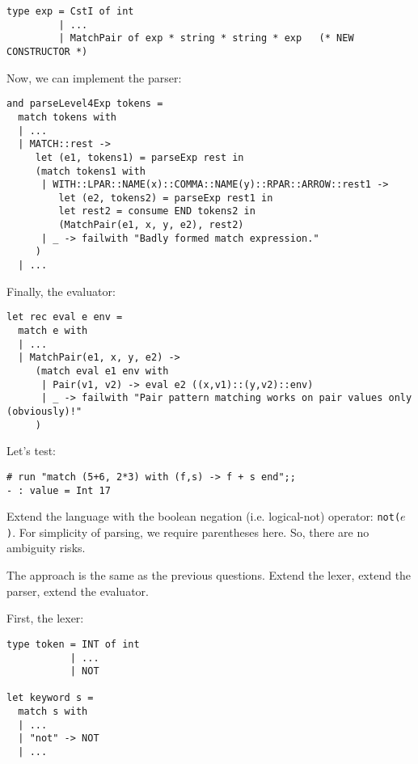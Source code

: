 \documentclass[addpoints]{exam}
\begin{document}
\begin{questions}
\begin{solution}
    \begin{verbatim}
type exp = CstI of int
         | ...
         | MatchPair of exp * string * string * exp   (* NEW CONSTRUCTOR *)
    \end{verbatim}

    Now, we can implement the parser:

    \begin{verbatim}
and parseLevel4Exp tokens =
  match tokens with
  | ...
  | MATCH::rest ->
     let (e1, tokens1) = parseExp rest in
     (match tokens1 with
      | WITH::LPAR::NAME(x)::COMMA::NAME(y)::RPAR::ARROW::rest1 ->
         let (e2, tokens2) = parseExp rest1 in
         let rest2 = consume END tokens2 in
         (MatchPair(e1, x, y, e2), rest2)
      | _ -> failwith "Badly formed match expression."
     )
  | ...
    \end{verbatim}

    Finally, the evaluator:

    \begin{verbatim}
let rec eval e env =
  match e with
  | ...
  | MatchPair(e1, x, y, e2) ->
     (match eval e1 env with
      | Pair(v1, v2) -> eval e2 ((x,v1)::(y,v2)::env)
      | _ -> failwith "Pair pattern matching works on pair values only (obviously)!"
     )
    \end{verbatim}

    
    Let's test:
    \begin{verbatim}
# run "match (5+6, 2*3) with (f,s) -> f + s end";; 
- : value = Int 17
    \end{verbatim}
  \end{solution}


  
  \question
  Extend the language with
  the boolean negation (i.e. logical-not) operator: \texttt{not($e$)}.
  For simplicity of parsing, we require parentheses here.
  So, there are no ambiguity risks.


  \begin{solution}
    The approach is the same as the previous questions.
    Extend the lexer, extend the parser, extend the evaluator.

    First, the lexer:
    
    \begin{verbatim}
type token = INT of int
           | ...
           | NOT

let keyword s =
  match s with
  | ...
  | "not" -> NOT
  | ...
    \end{verbatim}


\end{solution}
\end{questions}
\end{document}

